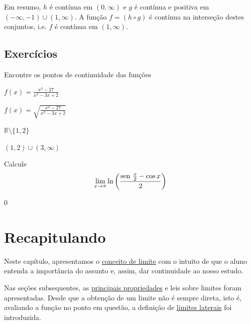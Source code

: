 \cleardoublepage\documentclass[../main.tex]{subfiles}
\begin{document}
\begin{exeresol}
\begin{compactenum}[a)]
\begin{resol}
  Em resumo, $h$ é contínua em $(0, \infty)$ e $g$ é contínua e positiva em $(-\infty, -1)\cup (1, \infty)$. A função $f = (h\circ g)$ é contínua na interseção destes conjuntos, i.e. $f$ é contínua em $(1, \infty)$. 
\end{resol}
  \end{compactenum}
  \end{exeresol}

\subsection{Exercícios}
\begin{exer}
  Encontre os pontos de continuidade das funções
  \begin{multicols}{2}
  \begin{compactenum}[a)]
  \item $f(x) = \frac{x^3 - 27}{x^2 - 3x + 2}$
  \item $ f(x) = \sqrt{\frac{x^3 - 27}{x^2 - 3x + 2}}$
  \end{compactenum}
  \end{multicols}
 \end{exer}
\begin{resp}
\begin{compactenum}[a)]
\item  $\mathbb{R}\setminus\{1,2\}$
\item   $(1, 2)\cup (3, \infty)$
\end{compactenum}
 \end{resp}

\begin{exer}
  Calcule
  \begin{equation*}
    \lim_{x\to \pi} \ln \left(\frac{\operatorname{sen}\, \frac{x}{2} - \cos x}{2}\right)
  \end{equation*}
\end{exer}
\begin{resp}
  $0$
\end{resp}

\section{Recapitulando}
Neste capítulo, apresentamos o \hyperlink{ConceitoLimite}{conceito de limite} com o intuito de que o aluno entenda a importância do assunto e, assim, dar continuidade ao nosso estudo. 

Nas seções subsequentes, as \hyperlink{PropLimite}{principais propriedades} e leis sobre limites foram apresentadas. Desde que a obtenção de um limite não é sempre direta, isto é, avaliando a função no ponto em questão, a definição de \hyperlink{LimLateral}{limites laterais} foi introduzida.
\end{document}
